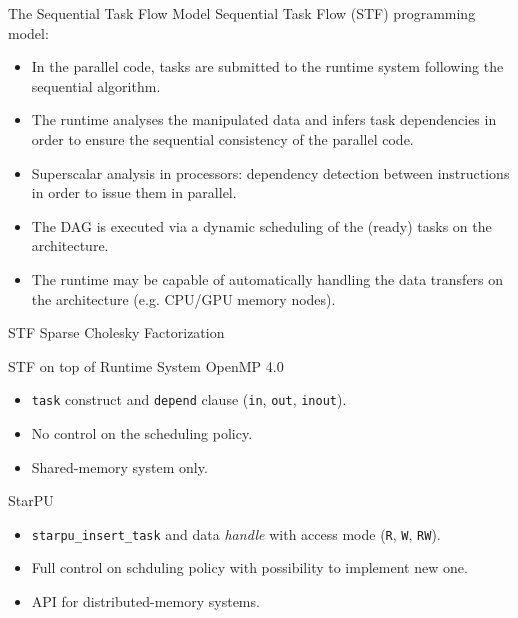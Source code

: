 \documentclass[unknownkeysallowed]{beamer}
\newcommand{\db}[1]{\textcolor{mblue}{#1\xspace}}
\begin{document}
\begin{frame}{The Sequential Task Flow Model}  
  \alert{Sequential Task Flow} (STF) programming model:

  \begin{itemize}
  \item In the parallel code, tasks are submitted to the runtime
    system following the \db{sequential algorithm}.
    \vspace{0.2cm}
  \item The runtime analyses the manipulated data and infers task
    dependencies in order to ensure the \db{sequential consistency} of
    the parallel code.
    \vspace{0.2cm}
  \item \db{Superscalar analysis} in processors: dependency detection
    between instructions in order to issue them in parallel.
    \vspace{0.2cm}
  \item The DAG is executed via a \db{dynamic scheduling} of the
    (ready) tasks on the architecture.
    \vspace{0.2cm}
  \item The runtime may be capable of automatically handling the
    \db{data transfers} on the architecture (e.g. CPU/GPU memory
    nodes).
    \vspace{0.2cm}
  \end{itemize} 
\end{frame}

\begin{frame}[fragile,t]{STF Sparse Cholesky Factorization}
      \only<1>{}
\end{frame}

\begin{frame}{STF on top of Runtime System}
  \alert{OpenMP 4.0}
  \begin{itemize}
  \item \texttt{task} construct and \texttt{depend} clause (\texttt{in}, \texttt{out},
    \texttt{inout}).
  \item No control on the scheduling policy.
  \item Shared-memory system only.
  \end{itemize}

  \vspace{0.5cm}

  \alert{StarPU}
  \begin{itemize}
  \item \texttt{starpu\_insert\_task} and data \textit{handle} with
    access mode (\texttt{R}, \texttt{W}, \texttt{RW}).
  \item Full control on schduling policy with possibility to implement
    new one.
  \item API for distributed-memory systems.
  \end{itemize}  
\end{frame}
\end{document}
